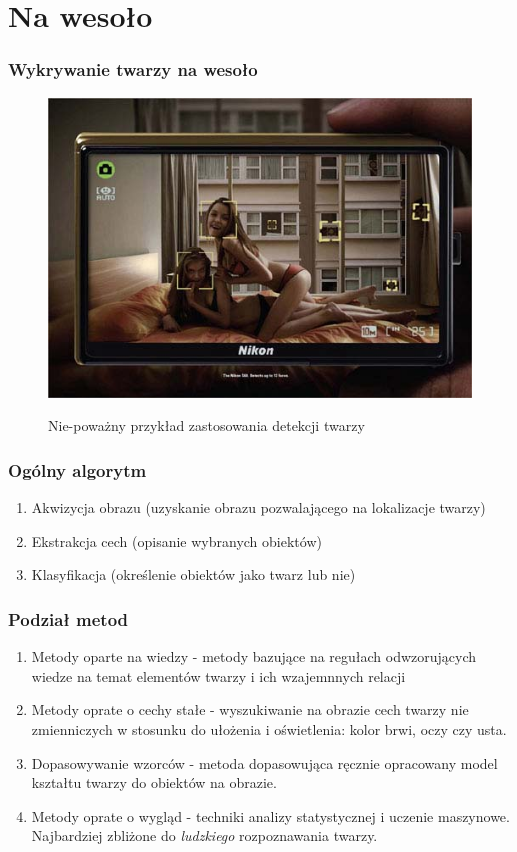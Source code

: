 \documentclass[xcolor=table]{beamer}
\begin{document}
\section{Na wesoło}
\begin{frame}
  \frametitle{Wykrywanie twarzy na wesoło}

\begin{figure}
  {\includegraphics[scale=0.5]{funny.jpg}}
\caption{ Nie-poważny przykład zastosowania detekcji twarzy}
\end{figure}

\end{frame}

\begin{frame}
  \frametitle{Ogólny algorytm}

\begin{enumerate}
\item Akwizycja obrazu (uzyskanie obrazu pozwalającego na lokalizacje twarzy) \pause
\item Ekstrakcja cech (opisanie wybranych obiektów) \pause
\item Klasyfikacja (określenie obiektów jako twarz lub nie)
\end{enumerate}
   
\end{frame}

\begin{frame}
\frametitle{Podział metod}

\begin{enumerate}
\item Metody oparte na wiedzy - metody bazujące na regułach odwzorujących wiedze na temat elementów twarzy i ich wzajemnnych relacji \pause
\item Metody oprate o cechy stałe - wyszukiwanie na obrazie cech twarzy nie zmienniczych w stosunku do ułożenia i oświetlenia: kolor brwi, oczy czy usta. \pause
\item Dopasowywanie wzorców - metoda dopasowująca ręcznie opracowany model kształtu twarzy do obiektów na obrazie. \pause
\item Metody oprate o wygląd - techniki analizy statystycznej i uczenie maszynowe. Najbardziej zbliżone do \emph{ludzkiego} rozpoznawania twarzy.
\end{enumerate}
   
\end{frame}
\end{document}
